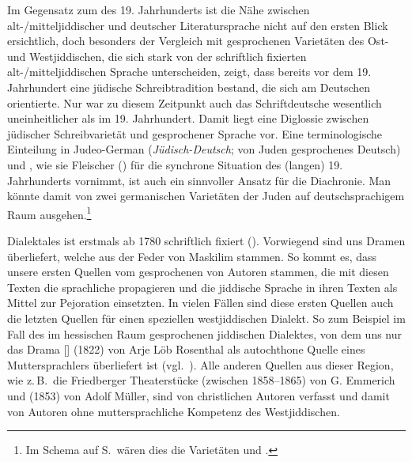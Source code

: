 Im Gegensatz zum  des 19. Jahrhunderts ist die Nähe zwischen alt-/mitteljid\-discher und deutscher Literatursprache nicht auf den ersten Blick ersichtlich, doch besonders der Vergleich mit gesprochenen Varietäten des Ost- und Westjiddischen, die sich stark von der schriftlich fixierten alt-/mitteljiddischen Sprache unterscheiden, zeigt, dass bereits vor dem 19. Jahrhundert eine jüdische Schreibtradition bestand, die sich am Deutschen orientierte. Nur war zu diesem Zeitpunkt auch das Schriftdeutsche wesentlich uneinheitlicher als im 19. Jahrhundert. Damit liegt eine Diglossie zwischen jüdischer Schreibvarietät und gesprochener Sprache vor. Eine terminologische Einteilung in Judeo-German (\textit{Jüdisch-Deutsch}; von Juden gesprochenes Deutsch) und , wie sie Fleischer (\citeyear{FleischerimErsch}) für die synchrone Situation des (langen) 19. Jahrhunderts vornimmt, ist auch ein sinnvoller Ansatz für die Diachronie. Man könnte damit von zwei germanischen Varietäten der Juden auf deutschsprachigem Raum ausgehen.\footnote{Im Schema auf S.\, \pageref{schämamultilingualismus} wären dies die Varietäten  und .}

Dialektales  ist erstmals ab 1780 schriftlich fixiert (\citealt[180]{Lowenstein1979}). Vorwiegend sind uns Dramen überliefert, welche aus der Feder von Maskilim stammen. So kommt es, dass unsere ersten Quellen vom gesprochenen  von Autoren stammen, die mit diesen Texten die sprachliche  propagieren und die jiddische Sprache in ihren Texten als Mittel zur Pejoration einsetzten. In vielen Fällen sind diese ersten Quellen auch die letzten Quellen für einen speziellen westjiddischen Dialekt. So zum Beispiel im Fall des im hessischen Raum gesprochenen jiddischen Dialektes, von dem uns nur das Drama  [] (1822) von Arje Löb Rosenthal als autochthone Quelle eines Muttersprachlers überliefert ist (vgl.\, \citealt{Lowenstein1975}). Alle anderen Quellen  aus dieser Region, wie z.\,B.\, die Friedberger Theaterstücke  (zwischen 1858–1865) von G. Emmerich und   (1853) von Adolf Müller, sind von christlichen Autoren verfasst und damit von Autoren ohne muttersprachliche Kompetenz des Westjiddischen. 

